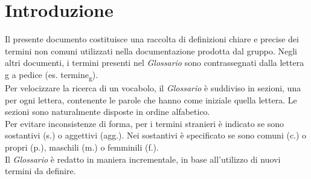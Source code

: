 \section*{Introduzione}
    Il presente documento costituisce una raccolta di definizioni chiare e precise dei termini non
    comuni utilizzati nella documentazione prodotta dal gruppo. Negli altri documenti, i termini
    presenti nel \textit{Glossario} sono contrassegnati dalla lettera g a pedice (es. termine\textsubscript{g}).\\
    Per velocizzare la ricerca di un vocabolo, il \textit{Glossario} è suddiviso in sezioni,
    una per ogni lettera, contenente le parole che hanno come iniziale quella lettera. Le sezioni sono 
    naturalmente disposte in ordine alfabetico.\\
    Per evitare inconsistenze di forma, per i termini stranieri è indicato se sono sostantivi (s.) o aggettivi (agg.).
    Nei sostantivi è specificato se sono comuni (c.) o propri (p.), maschili (m.) o femminili (f.).\\
    Il \textit{Glossario} è redatto in maniera incrementale, in base all'utilizzo
    di nuovi termini da definire.
